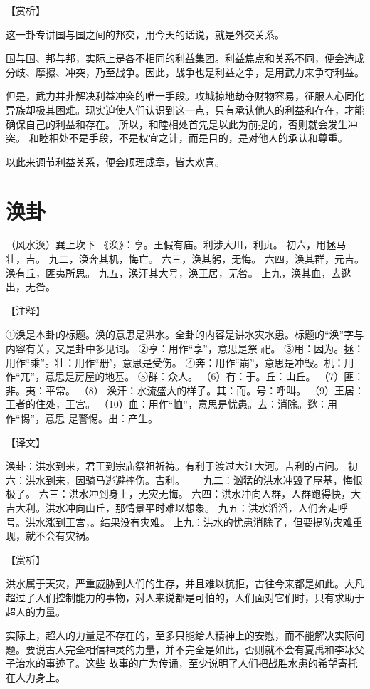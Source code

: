 \documentclass[a4paper,12pt,UTF8,twoside]{ctexbook}
\begin{document}
【赏析】

这一卦专讲国与国之间的邦交，用今天的话说，就是外交关系。

国与国、邦与邦，实际上是各不相同的利益集团。利益焦点和关系不同，便会造成分歧、摩擦、冲突，乃至战争。因此，战争也是利益之争，是用武力来争夺利益。

但是，武力并非解决利益冲突的唯一手段。攻城掠地劫夺财物容易，征服人心同化异族却极其困难。现实迫使人们认识到这一点，只有承认他人的利益和存在，才能确保自己的利益和存在。 所以，和睦相处首先是以此为前提的，否则就会发生冲突。 和睦相处不是手段，不是权宜之计，而是目的，是对他人的承认和尊重。

以此来调节利益关系，便会顺理成章，皆大欢喜。

\chapter{涣卦}

（风水涣）巽上坎下
《涣》：亨。王假有庙。利涉大川，利贞。
初六，用拯马壮，吉。
九二，涣奔其机，悔亡。
六三，涣其躬，无悔。
六四，涣其群，元吉。涣有丘，匪夷所思。
九五，涣汗其大号，涣王居，无咎。
上九，涣其血，去逖出，无咎。

【注释】

①涣是本卦的标题。涣的意思是洪水。全卦的内容是讲水灾水患。标题的“涣”字与内容有关，又是卦中多见词。
②亨：用作“享”，意思是祭 祀。
③用：因为。拯：用作“乘”。壮：用作“册’，意思是受伤。
④奔：用作“崩”，意思是冲毁。机：用作“兀”，意思是房屋的地基。
⑤群：众人。
（6）有：于。丘：山丘。
（7）匪：非。夷：平常。
（8） 涣汗：水流盛大的样子。其：而。号：呼叫。
（9）王居：王者的住处，王宫。
（10）血：用作“恤”，意思是忧患。去：消除。逖：用作“惕”，意思 是警惕。出：产生。

【译文】

涣卦：洪水到来，君王到宗庙祭祖祈祷。有利于渡过大江大河。吉利的占问。
初六：洪水到来，因骑马逃避摔伤。吉利。　　
九二：汹猛的洪水冲毁了屋基，悔恨极了。
六三：洪水冲到身上，无灾无悔。
六四：洪水冲向人群，人群跑得快，大吉大利。洪水冲向山丘，那情景平时难以想象。
九五：洪水滔滔，人们奔走呼号。洪水涨到王宫，。结果没有灾难。
上九：洪水的忧患消除了，但要提防灾难重现，就不会有灾祸。

【赏析】

洪水属于天灾，严重威胁到人们的生存，并且难以抗拒，古往今来都是如此。大凡超过了人们控制能力的事物，对人来说都是可怕的，人们面对它们时，只有求助于超人的力量。

实际上，超人的力量是不存在的，至多只能给人精神上的安慰，而不能解决实际问题。要说古人完全相信神灵的力量，并不完全是如此，否则就不会有夏禹和李冰父子治水的事迹了。这些 故事的广为传诵，至少说明了人们把战胜水患的希望寄托在人力身上。
\end{document}
